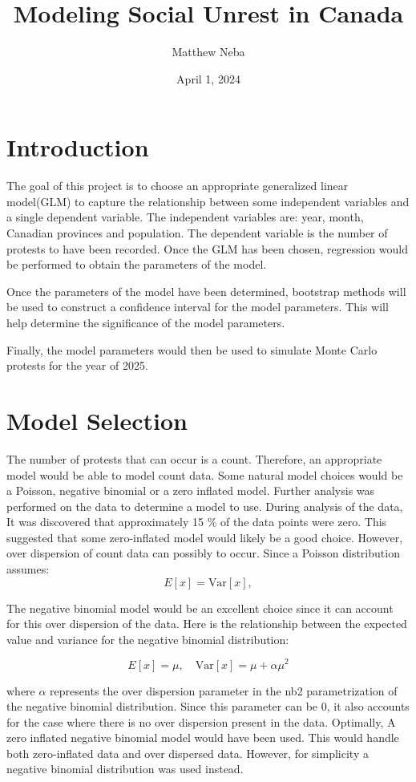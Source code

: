 \documentclass{article}
\title{Modeling Social Unrest in Canada}
\author{Matthew Neba}
\date{April 1, 2024}
\begin{document}
\maketitle

\section{Introduction}
    The goal of this project is to choose an appropriate generalized linear model(GLM)  to capture the relationship between some independent variables and a single dependent variable. The independent variables are: year, month, Canadian provinces and population. The dependent variable is the number of protests to have been recorded. Once the GLM has been chosen, regression would be performed to obtain the parameters of the model.

    Once the parameters of the model have been determined, bootstrap methods will be used to construct a confidence interval for the model parameters. This will help determine the significance of the model parameters. 

Finally, the model parameters would then be used to simulate Monte Carlo protests for the year of 2025. 
\section{Model Selection}

    The number of protests that can occur is a count. Therefore, an appropriate model would be able to model count data. Some natural model choices would be a Poisson, negative binomial or a zero inflated model. Further analysis was performed on the data to determine a model to use. During analysis of the data, It was discovered that approximately 15 \% of the data points were zero. This suggested that some zero-inflated model would likely be a good choice. However, over dispersion of count data can possibly to occur. Since a Poisson distribution assumes:
\[ E[x] = \text{Var}[x], \] 

    The negative binomial model would be an excellent choice since it can account for this over dispersion of the data. Here is the relationship between the expected value and variance for the negative binomial distribution: 

\[ E[x] = \mu, \quad \text{Var}[x] = \mu + \alpha \mu^2 \]

where \(\alpha\) represents the over dispersion parameter in the nb2 parametrization of the negative binomial distribution. Since this parameter can be 0, it also accounts for the case where there is no over dispersion present in the data. Optimally, A zero inflated negative binomial model would have been used. This would handle both zero-inflated data and over dispersed data. However, for simplicity a negative binomial distribution was used instead. 
\end{document}
